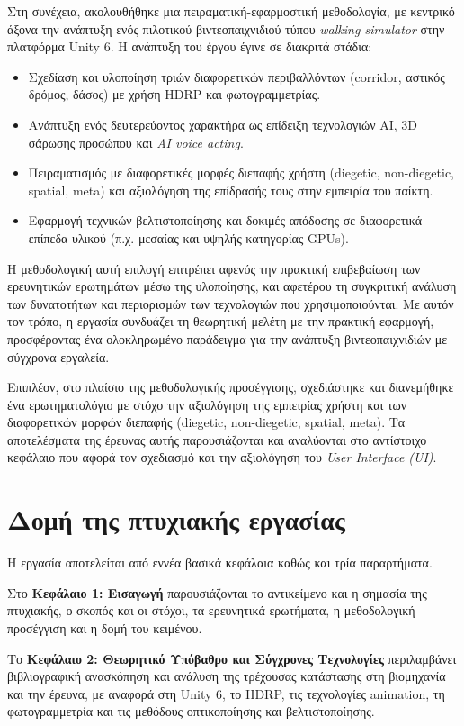 Στη συνέχεια, ακολουθήθηκε μια πειραματική-εφαρμοστική μεθοδολογία,
με κεντρικό άξονα την ανάπτυξη ενός πιλοτικού βιντεοπαιχνιδιού τύπου
\textit{walking simulator} στην πλατφόρμα Unity 6. Η ανάπτυξη του έργου
έγινε σε διακριτά στάδια:
\begin{itemize}
  \item Σχεδίαση και υλοποίηση τριών διαφορετικών περιβαλλόντων
  (corridor, αστικός δρόμος, δάσος) με χρήση HDRP και φωτογραμμετρίας.
  \item Ανάπτυξη ενός δευτερεύοντος χαρακτήρα ως επίδειξη τεχνολογιών AI,
  3D σάρωσης προσώπου και \textit{AI voice acting}.
  \item Πειραματισμός με διαφορετικές μορφές διεπαφής χρήστη
  (diegetic, non-diegetic, spatial, meta) και αξιολόγηση της επίδρασής
  τους στην εμπειρία του παίκτη.
  \item Εφαρμογή τεχνικών βελτιστοποίησης και δοκιμές απόδοσης σε
  διαφορετικά επίπεδα υλικού (π.χ. μεσαίας και υψηλής κατηγορίας GPUs).
\end{itemize}

Η μεθοδολογική αυτή επιλογή επιτρέπει αφενός την πρακτική επιβεβαίωση
των ερευνητικών ερωτημάτων μέσω της υλοποίησης, και αφετέρου τη
συγκριτική ανάλυση των δυνατοτήτων και περιορισμών των τεχνολογιών που
χρησιμοποιούνται. Με αυτόν τον τρόπο, η εργασία συνδυάζει τη θεωρητική
μελέτη με την πρακτική εφαρμογή, προσφέροντας ένα ολοκληρωμένο παράδειγμα
για την ανάπτυξη βιντεοπαιχνιδιών με σύγχρονα εργαλεία. 

Επιπλέον, στο πλαίσιο της μεθοδολογικής προσέγγισης, σχεδιάστηκε και
διανεμήθηκε ένα ερωτηματολόγιο με στόχο την αξιολόγηση της εμπειρίας
χρήστη και των διαφορετικών μορφών διεπαφής (diegetic, non-diegetic,
spatial, meta). Τα αποτελέσματα της έρευνας αυτής παρουσιάζονται και
αναλύονται στο αντίστοιχο κεφάλαιο που αφορά τον σχεδιασμό και την
αξιολόγηση του \textit{User Interface (UI)}.

\section{Δομή της πτυχιακής εργασίας}
Η εργασία αποτελείται από εννέα βασικά κεφάλαια καθώς και τρία
παραρτήματα.

Στο \textbf{Κεφάλαιο 1: Εισαγωγή} παρουσιάζονται το αντικείμενο και η
σημασία της πτυχιακής, ο σκοπός και οι στόχοι, τα ερευνητικά ερωτήματα,
η μεθοδολογική προσέγγιση και η δομή του κειμένου.

Το \textbf{Κεφάλαιο 2: Θεωρητικό Υπόβαθρο και Σύγχρονες Τεχνολογίες}
περιλαμβάνει βιβλιογραφική ανασκόπηση και ανάλυση της τρέχουσας
κατάστασης στη βιομηχανία και την έρευνα, με αναφορά στη Unity 6, το
HDRP, τις τεχνολογίες animation, τη φωτογραμμετρία και τις μεθόδους
οπτικοποίησης και βελτιστοποίησης.

